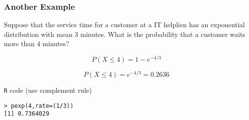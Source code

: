 

\begin{frame}[fragile]
\Large
\frametitle{Another Example}
Suppose that the service time for a customer at a IT helplien
has an exponential distribution with mean 3 minutes. What is the probability that a
customer waits more than 4 minutes?

\[ P(X  \leq 4) = 1 -  e^{-4/3} \]

\[ P(X  \leq 4) = e^{-4/3} = 0.2636 \]


\texttt{R} code (use complement rule)
\begin{verbatim}
> pexp(4,rate=(1/3))
[1] 0.7364029
\end{verbatim}
\end{frame}















